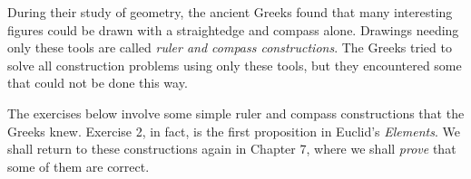 \documentclass[11pt]{book}
\begin{document}
During their study of geometry, the ancient Greeks found that many interesting
figures could be drawn with a straightedge and compass alone. Drawings needing
only these tools are called \emph{ruler and compass constructions}. The Greeks
tried to solve all construction problems using only these tools, but they
encountered some that could not be done this way.

The exercises below involve some simple ruler and compass constructions that the
Greeks knew. Exercise 2, in fact, is the first proposition in Euclid's
\emph{Elements}. We shall return to these constructions again in Chapter 7, where
we shall \emph{prove} that some of them are correct.

\end{document}
